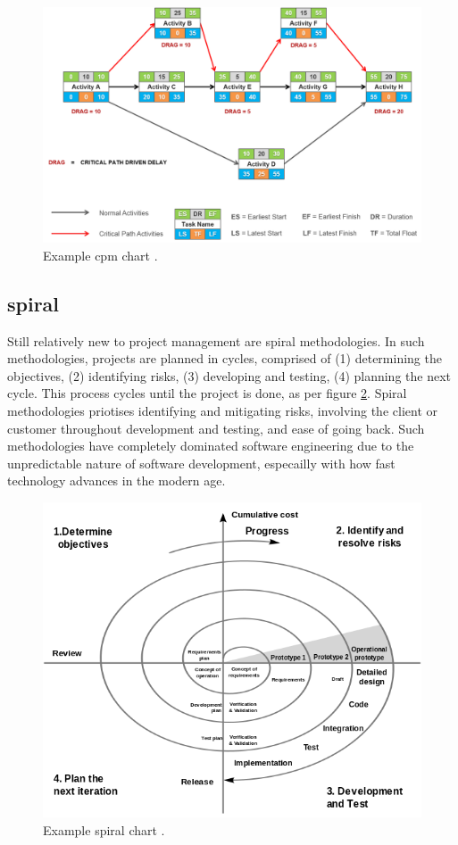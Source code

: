 \documentclass[11pt]{article}
\begin{document}
\begin{figure}[h!]
    \centering
    \includegraphics[width=\textwidth]{figures/cpm.png}
    \caption{Example \acrshort{cpm} chart \cite{cpm}.}
    \label{fig:cpm-chart}
\end{figure}

\subsection{\Gls{spiral}}

Still relatively new to project management are \gls{spiral} methodologies. In such methodologies, projects are planned in cycles, comprised of (1) determining the objectives, (2) identifying risks, (3) developing and testing, (4) planning the next cycle. This process cycles until the project is done, as per figure \ref{fig:spiral}. Spiral methodologies priotises identifying and mitigating risks, involving the client or customer throughout development and testing, and ease of going back. Such methodologies have completely dominated software engineering due to the unpredictable nature of software development, especailly with how fast technology advances in the modern age.

\begin{figure}[h!]
    \centering
    \includegraphics[width=\textwidth]{figures/spiral_model.png}
    \caption{Example \gls{spiral} chart \cite{waterfall-vs-spiral}.}
    \label{fig:spiral}
\end{figure}
\end{document}
